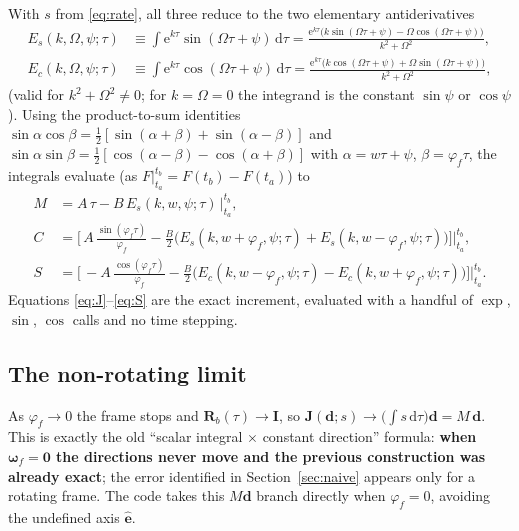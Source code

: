\documentclass[11pt]{article}
\newcommand{\dd}{\,\mathrm{d}}
\newcommand{\e}{\mathrm{e}}
\newcommand{\Rb}{\mathbf{R}_b}
\newcommand{\nf}{\hat{\mathbf{e}}}            %
\newcommand{\Om}{\Omega}
\newcommand{\bwf}{\boldsymbol{\omega}_f}
\begin{document}
With $s$ from \eqref{eq:rate}, all three reduce to the two elementary antiderivatives
\begin{align}
  E_s(k,\Om,\psi;\tau)&\equiv\int \e^{k\tau}\sin(\Om\tau+\psi)\dd\tau
   = \frac{\e^{k\tau}\big(k\sin(\Om\tau+\psi)-\Om\cos(\Om\tau+\psi)\big)}{k^2+\Om^2},\\
  E_c(k,\Om,\psi;\tau)&\equiv\int \e^{k\tau}\cos(\Om\tau+\psi)\dd\tau
   = \frac{\e^{k\tau}\big(k\cos(\Om\tau+\psi)+\Om\sin(\Om\tau+\psi)\big)}{k^2+\Om^2},
\end{align}
(valid for $k^2+\Om^2\neq0$; for $k=\Om=0$ the integrand is the constant $\sin\psi$ or
$\cos\psi$). Using the product-to-sum identities
$\sin\alpha\cos\beta=\tfrac12[\sin(\alpha+\beta)+\sin(\alpha-\beta)]$ and
$\sin\alpha\sin\beta=\tfrac12[\cos(\alpha-\beta)-\cos(\alpha+\beta)]$ with
$\alpha=w\tau+\psi$, $\beta=\varphi_f\tau$, the integrals evaluate (as
$F\big|_{t_a}^{t_b}=F(t_b)-F(t_a)$) to
\begin{align}
  M &= A\,\tau - B\,E_s(k,w,\psi;\tau)\,\Big|_{t_a}^{t_b}, \label{eq:M}\\[2pt]
  C &= \Big[\,A\,\tfrac{\sin(\varphi_f\tau)}{\varphi_f}
      - \tfrac{B}{2}\big(E_s(k,w{+}\varphi_f,\psi;\tau)+E_s(k,w{-}\varphi_f,\psi;\tau)\big)\Big]\Big|_{t_a}^{t_b}, \label{eq:C}\\[2pt]
  S &= \Big[\,-A\,\tfrac{\cos(\varphi_f\tau)}{\varphi_f}
      - \tfrac{B}{2}\big(E_c(k,w{-}\varphi_f,\psi;\tau)-E_c(k,w{+}\varphi_f,\psi;\tau)\big)\Big]\Big|_{t_a}^{t_b}. \label{eq:S}
\end{align}
Equations \eqref{eq:J}--\eqref{eq:S} are the exact increment, evaluated with a handful of
$\exp$, $\sin$, $\cos$ calls and no time stepping.

\subsection{The non-rotating limit}

As $\varphi_f\to0$ the frame stops and $\Rb(\tau)\to\mathbf{I}$, so
$\mathbf{J}(\mathbf{d};s)\to\big(\int s\dd\tau\big)\mathbf{d}=M\,\mathbf{d}$. This is exactly
the old ``scalar integral $\times$ constant direction'' formula: \textbf{when $\bwf=\mathbf
0$ the directions never move and the previous construction was already exact}; the error
identified in Section~\ref{sec:naive} appears only for a rotating frame. The code takes
this $M\mathbf{d}$ branch directly when $\varphi_f=0$, avoiding the undefined axis $\nf$.

\end{document}

